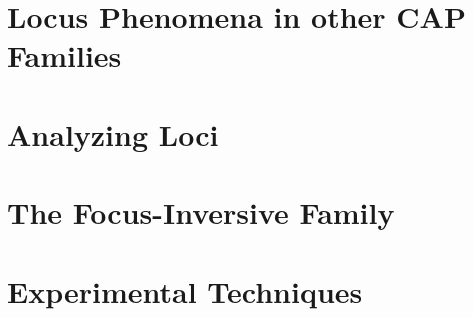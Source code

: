 \documentclass{book}
\begin{document}
\chapter[Loci in CAP Pairs]{Locus Phenomena in other CAP Families}
\label{chap:06-cap-loci}


\chapter{Analyzing Loci}
\label{chap:07-n3-loci}


\chapter{The Focus-Inversive Family}
\label{chap:08-focus-inversive}


\chapter{Experimental Techniques}
\label{chap:09-experimental}



 
%

%

%
\end{document}
